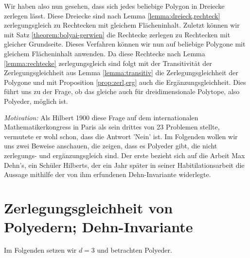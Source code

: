 \documentclass[11pt,titlepage]{article}
\theoremstyle{definition}
\theoremstyle{remark}
\begin{document}
	Wir haben also nun gesehen, dass sich jedes beliebige Polygon in Dreiecke zerlegen lässt. Diese Dreiecke 
	sind nach Lemma \ref{lemma:dreieck,rechteck} zerlegungsgleich zu Rechtecken mit gleichem 
	Flächeninhalt. Zuletzt können wir mit Satz \ref{theorem:bolyai-gerwien} die Rechtecke zerlegen zu Rechtecken 
	mit gleicher Grundseite. Dieses Verfahren können wir nun auf beliebige Polygone mit gleichem Flächeninhalt 
	anwenden. Da diese Rechtecke nach Lemma \ref{lemma:rechtecke} zerlegungsgleich sind folgt mit der 
	Transitivität der Zerlegungsgleichheit aus Lemma \ref{lemma:transitiv} die Zerlegungsgleichheit der Polygone und 
	mit Proposition \ref{prop:zerl,erg} auch die Ergänzungsgleichheit. 
	Dies führt uns zu der Frage, ob das gleiche auch für dreidimensionale Polytope, also Polyeder, möglich ist.
	
	\textsl{Motivation:} Als Hilbert 1900 diese Frage auf dem internationalen Mathematikerkongress in Paris als 
	sein drittes von 23 Problemen stellte, vermutete er wohl schon, dass die Antwort 'Nein' ist. Im Folgenden wollen wir 
	uns zwei Beweise anschauen, die zeigen, dass es Polyeder gibt, die nicht zerlegungs- und ergänzungsgleich sind. 
	Der erste bezieht sich auf die Arbeit Max Dehn's, ein Schüler Hilberts, der ein Jahr später in seiner Habitilationsarbeit 
	die Aussage mithilfe der von ihm erfundenen Dehn-Invariante widerlegte.
	
	\newpage
	
	\section{Zerlegungsgleichheit von Polyedern; Dehn-Invariante}
	
	Im Folgenden setzen wir $d=3$ und betrachten Polyeder.
	
\end{document}
